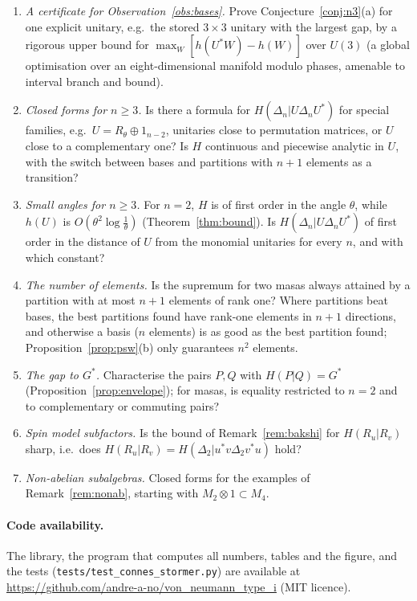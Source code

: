 \documentclass[11pt]{article}
\theoremstyle{plain}
\theoremstyle{definition}
\theoremstyle{remark}
\begin{document}
\begin{enumerate}
\item[(1)] \emph{A certificate for Observation~\ref{obs:bases}.} Prove Conjecture~\ref{conj:n3}(a) for one explicit unitary,
e.g.\ the stored $3\times3$ unitary with the largest gap, by a rigorous upper bound for $\max_W[h(U^*W)-h(W)]$ over $U(3)$
(a global optimisation over an eight-dimensional manifold modulo phases, amenable to interval branch and bound).
\item[(2)] \emph{Closed forms for $n\ge3$.} Is there a formula for $H(\Delta_n|U\Delta_nU^*)$ for special families, e.g.\
$U=R_\theta\oplus1_{n-2}$, unitaries close to permutation matrices, or $U$ close to a complementary one? Is $H$ continuous
and piecewise analytic in $U$, with the switch between bases and partitions with $n+1$ elements as a transition?
\item[(3)] \emph{Small angles for $n\ge3$.} For $n=2$, $H$ is of first order in the angle $\theta$, while $h(U)$ is
$O(\theta^2\log\frac1\theta)$ (Theorem~\ref{thm:bound}). Is $H(\Delta_n|U\Delta_nU^*)$ of first order in the distance of $U$ from the
monomial unitaries for every $n$, and with which constant?
\item[(4)] \emph{The number of elements.} Is the supremum for two masas always attained by a partition with at most $n+1$
elements of rank one? Where partitions beat bases, the best partitions found have rank-one elements in $n+1$ directions,
and otherwise a basis ($n$ elements) is as good as the best partition found; Proposition~\ref{prop:psw}(b) only guarantees
$n^2$ elements.
\item[(5)] \emph{The gap to $G^*$.} Characterise the pairs $P,Q$ with $H(P|Q)=G^*$ (Proposition~\ref{prop:envelope}); for masas,
is equality restricted to $n=2$ and to complementary or commuting pairs?
\item[(6)] \emph{Spin model subfactors.} Is the bound of Remark~\ref{rem:bakshi} for $H(R_u|R_v)$ sharp, i.e.\ does
$H(R_u|R_v)=H(\Delta_2|u^*v\Delta_2v^*u)$ hold?
\item[(7)] \emph{Non-abelian subalgebras.} Closed forms for the examples of Remark~\ref{rem:nonab}, starting with
$M_2\otimes1\subset M_4$.
\end{enumerate}

\paragraph{Code availability.} The library, the program that computes all numbers, tables and the figure, and the tests
(\texttt{tests/\allowbreak test\_\allowbreak connes\_\allowbreak stormer.py}) are available at
\url{https://github.com/andre-a-no/von_neumann_type_i} (MIT licence).
\end{document}
